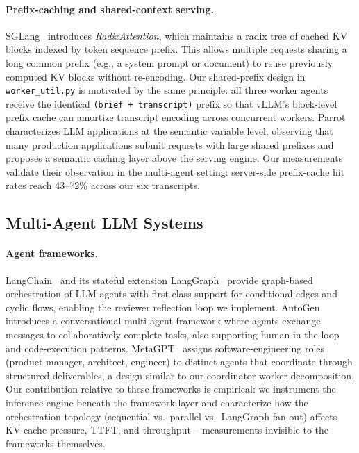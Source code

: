 \paragraph{Prefix-caching and shared-context serving.}
SGLang~\cite{zheng2024sglang} introduces \emph{RadixAttention}, which
maintains a radix tree of cached KV blocks indexed by token sequence prefix.
This allows multiple requests sharing a long common prefix (e.g., a system
prompt or document) to reuse previously computed KV blocks without
re-encoding.  Our shared-prefix design in \texttt{worker\_util.py} is
motivated by the same principle: all three worker agents receive the
identical \texttt{(brief + transcript)} prefix so that vLLM's block-level
prefix cache can amortize transcript encoding across concurrent workers.
Parrot~\cite{lin2024parrot} characterizes LLM applications at the semantic
variable level, observing that many production applications submit requests
with large shared prefixes and proposes a semantic caching layer above the
serving engine.  Our measurements validate their observation in the
multi-agent setting: server-side prefix-cache hit rates reach 43–72\%
across our six transcripts.

\subsection{Multi-Agent LLM Systems}

\paragraph{Agent frameworks.}
LangChain~\cite{langchain2023} and its stateful extension
LangGraph~\cite{langgraph2024} provide graph-based orchestration of LLM
agents with first-class support for conditional edges and cyclic flows,
enabling the reviewer reflection loop we implement.  AutoGen~\cite{wu2023autogen}
introduces a conversational multi-agent framework where agents exchange
messages to collaboratively complete tasks, also supporting human-in-the-loop
and code-execution patterns.  MetaGPT~\cite{hong2023metagpt} assigns
software-engineering roles (product manager, architect, engineer) to distinct
agents that coordinate through structured deliverables, a design similar to
our coordinator-worker decomposition.  Our contribution relative to these
frameworks is empirical: we instrument the inference engine beneath the
framework layer and characterize how the orchestration topology (sequential
vs.\ parallel vs.\ LangGraph fan-out) affects KV-cache pressure, TTFT,
and throughput -- measurements invisible to the frameworks themselves.

